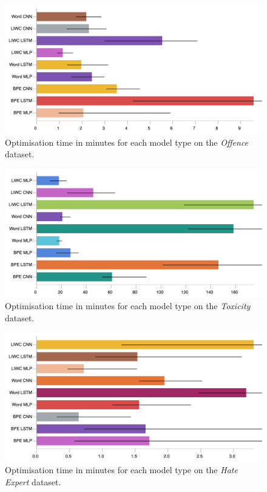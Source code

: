 \begin{figure}[h]
    \centering
    \includegraphics[width=\textwidth]{davidson_train_time.pdf}
    \caption{Optimisation time in minutes for each model type on the \textit{Offence} dataset.}
    \label{fig:davidson_train_time}
\end{figure}
\begin{figure}[h]
    \centering
    \includegraphics[width=\textwidth]{wulczyn_train_time.pdf}
    \caption{Optimisation time in minutes for each model type on the \textit{Toxicity} dataset.}
    \label{fig:wulczyn_train_time}
\end{figure}
\begin{figure}[h]
    \centering
    \includegraphics[width=\textwidth]{waseem_train_time.pdf}
    \caption{Optimisation time in minutes for each model type on the \textit{Hate Expert} dataset.}
    \label{fig:waseem_train_time}
\end{figure}

